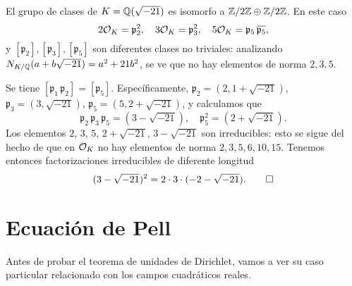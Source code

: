 \begin{ejemplo}
  El grupo de clases de $K = \mathbb{Q} (\sqrt{-21})$ es isomorfo a
  $\mathbb{Z}/2\mathbb{Z} \oplus \mathbb{Z}/2\mathbb{Z}$. En este caso
  \[ 2\mathcal{O}_K = \mathfrak{p}_2^2, \quad
     3\mathcal{O}_K = \mathfrak{p}_3^2, \quad
     5\mathcal{O}_K = \mathfrak{p}_5 \, \overline{\mathfrak{p}_5}, \]
  y $[\mathfrak{p}_2], [\mathfrak{p}_3], [\mathfrak{p}_5]$ son diferentes clases
  no triviales: analizando $N_{K/\mathbb{Q}} (a + b\sqrt{-21}) = a^2 + 21 b^2$,
  se ve que no hay elementos de norma $2,3,5$.

  Se tiene $[\mathfrak{p}_1\,\mathfrak{p}_2] = [\mathfrak{p}_5]$.
  Específicamente,
  $\mathfrak{p}_2 = (2, 1 + \sqrt{-21})$,
  $\mathfrak{p}_3 = (3, \sqrt{-21})$,
  $\mathfrak{p}_5 = (5, 2 + \sqrt{-21})$, y calculamos que
  \[ \mathfrak{p}_2\,\mathfrak{p}_3\,\mathfrak{p}_5 = (3 - \sqrt{-21}), \quad
     \mathfrak{p}_5^2 = (2 + \sqrt{-21}). \]
  Los elementos $2$, $3$, $5$, $2 + \sqrt{-21}$, $3 - \sqrt{-21}$
  son irreducibles: esto se sigue del hecho de que en $\mathcal{O}_K$ no hay elementos de
  norma $2, 3, 5, 6, 10, 15$. Tenemos entonces factorizaciones irreducibles de
  diferente longitud
  \[ (3 - \sqrt{-21})^2 = 2\cdot 3\cdot (-2 - \sqrt{-21}). \qedhere \]
\end{ejemplo}


\iffalse
\section{Ecuación de Pell}

Antes de probar el teorema de unidades de Dirichlet, vamos a ver su caso
particular relacionado con los campos cuadráticos reales.


